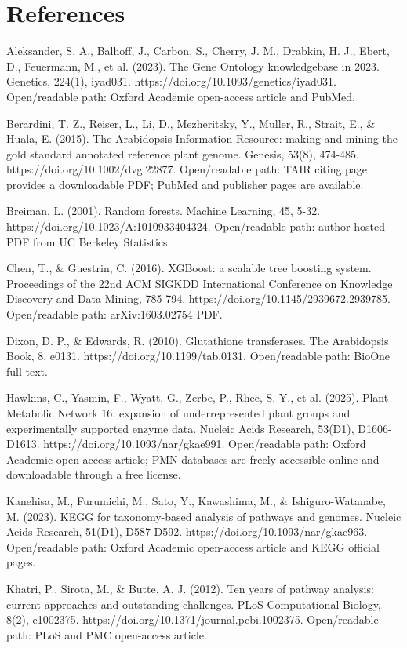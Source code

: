 \documentclass[11pt]{article}
\begin{document}
\section{References}
Aleksander, S. A., Balhoff, J., Carbon, S., Cherry, J. M., Drabkin, H. J., Ebert, D., Feuermann, M., et al. (2023). The Gene Ontology knowledgebase in 2023. Genetics, 224(1), iyad031. https://doi.org/10.1093/genetics/iyad031. Open/readable path: Oxford Academic open-access article and PubMed.

Berardini, T. Z., Reiser, L., Li, D., Mezheritsky, Y., Muller, R., Strait, E., \& Huala, E. (2015). The Arabidopsis Information Resource: making and mining the gold standard annotated reference plant genome. Genesis, 53(8), 474-485. https://doi.org/10.1002/dvg.22877. Open/readable path: TAIR citing page provides a downloadable PDF; PubMed and publisher pages are available.

Breiman, L. (2001). Random forests. Machine Learning, 45, 5-32. https://doi.org/10.1023/A:1010933404324. Open/readable path: author-hosted PDF from UC Berkeley Statistics.

Chen, T., \& Guestrin, C. (2016). XGBoost: a scalable tree boosting system. Proceedings of the 22nd ACM SIGKDD International Conference on Knowledge Discovery and Data Mining, 785-794. https://doi.org/10.1145/2939672.2939785. Open/readable path: arXiv:1603.02754 PDF.

Dixon, D. P., \& Edwards, R. (2010). Glutathione transferases. The Arabidopsis Book, 8, e0131. https://doi.org/10.1199/tab.0131. Open/readable path: BioOne full text.

Hawkins, C., Yasmin, F., Wyatt, G., Zerbe, P., Rhee, S. Y., et al. (2025). Plant Metabolic Network 16: expansion of underrepresented plant groups and experimentally supported enzyme data. Nucleic Acids Research, 53(D1), D1606-D1613. https://doi.org/10.1093/nar/gkae991. Open/readable path: Oxford Academic open-access article; PMN databases are freely accessible online and downloadable through a free license.

Kanehisa, M., Furumichi, M., Sato, Y., Kawashima, M., \& Ishiguro-Watanabe, M. (2023). KEGG for taxonomy-based analysis of pathways and genomes. Nucleic Acids Research, 51(D1), D587-D592. https://doi.org/10.1093/nar/gkac963. Open/readable path: Oxford Academic open-access article and KEGG official pages.

Khatri, P., Sirota, M., \& Butte, A. J. (2012). Ten years of pathway analysis: current approaches and outstanding challenges. PLoS Computational Biology, 8(2), e1002375. https://doi.org/10.1371/journal.pcbi.1002375. Open/readable path: PLoS and PMC open-access article.
\end{document}
